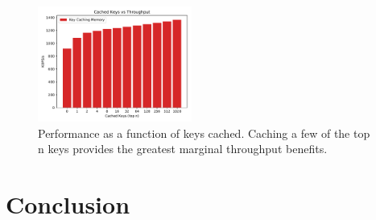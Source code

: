 \begin{figure}
    \includegraphics[width=0.45\textwidth]{fig/cache.pdf}
    \caption{Performance as a function of keys cached. Caching a few
    of the top n keys provides the greatest marginal throughput
    benefits.}
    \label{fig:cache}
\end{figure}

\section{Conclusion}









